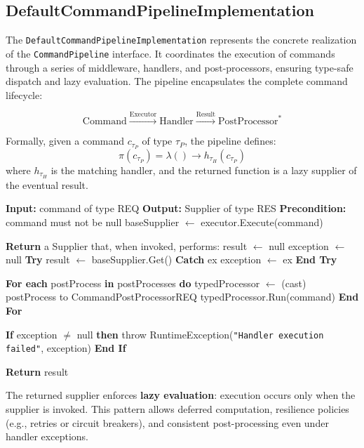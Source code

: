 \subsection{DefaultCommandPipelineImplementation}

The \texttt{DefaultCommandPipelineImplementation} represents the concrete realization of the \texttt{CommandPipeline} interface.  
It coordinates the execution of commands through a series of middleware, handlers, and post-processors, ensuring type-safe dispatch and lazy evaluation.  
The pipeline encapsulates the complete command lifecycle:

\[
\text{Command} \xrightarrow{\text{Executor}} \text{Handler} 
\xrightarrow{\text{Result}} \text{PostProcessor}^{*}
\]

Formally, given a command $c_{\tau_P}$ of type $\tau_P$, the pipeline defines:
\[
\pi(c_{\tau_P}) = \lambda () \rightarrow h_{\tau_H}(c_{\tau_P})
\]
where $h_{\tau_H}$ is the matching handler, and the returned function is a lazy supplier of the eventual result.

\begin{algorithm}[H]
\caption{DefaultCommandPipelineImplementation (\emph{Class})}
\begin{algorithmic}[1]

    \State \textbf{Input:} command of type \textlangle REQ\textrangle
    \State \textbf{Output:} Supplier of type \textlangle RES\textrangle
    \State \textbf{Precondition:} command must not be null
    \State baseSupplier $\gets$ executor.Execute(command)

    \State \textbf{Return} a Supplier that, when invoked, performs:
    \State \quad result $\gets$ null
    \State \quad exception $\gets$ null
    \State \quad \textbf{Try}
    \State \quad \quad result $\gets$ baseSupplier.Get()
    \State \quad \textbf{Catch} ex
    \State \quad \quad exception $\gets$ ex
    \State \quad \textbf{End Try}

    \State \quad \textbf{For each} postProcess \textbf{in} postProcesses \textbf{do}
    \State \quad \quad typedProcessor $\gets$ (cast) postProcess to CommandPostProcessor\textlangle REQ\textrangle
    \State \quad \quad typedProcessor.Run(command)
    \State \quad \textbf{End For}

    \State \quad \textbf{If} exception $\neq$ null \textbf{then}
    \State \quad \quad throw RuntimeException(\texttt{"Handler execution failed"}, exception)
    \State \quad \textbf{End If}

    \State \quad \textbf{Return} result
\EndProcedure

\end{algorithmic}
\end{algorithm}

The returned supplier enforces \textbf{lazy evaluation}: execution occurs only when the supplier is invoked.  
This pattern allows deferred computation, resilience policies (e.g., retries or circuit breakers), and consistent post-processing even under handler exceptions. 